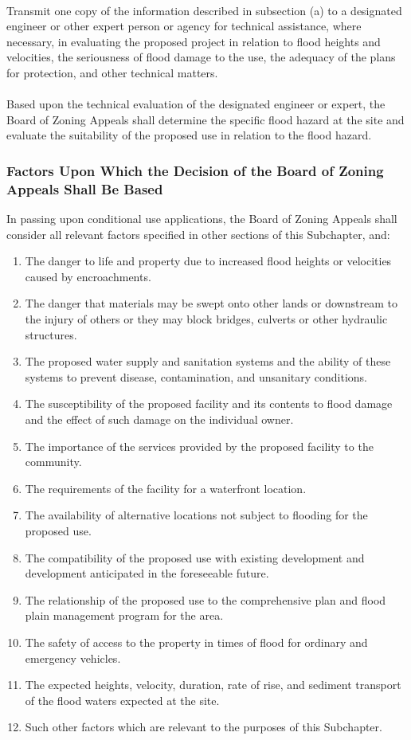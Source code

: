 \paragraph{}
Transmit one copy of the information described in subsection (a) to a designated engineer or other expert person or agency for technical assistance, where necessary, in evaluating the proposed project in relation to flood heights and velocities, the seriousness of flood damage to the use, the adequacy of the plans for protection, and other technical matters.
\paragraph{}
Based upon the technical evaluation of the designated engineer or expert, the Board of Zoning Appeals shall determine the specific flood hazard at the site and evaluate the suitability of the proposed use in relation to the flood hazard.
\subsubsection{Factors Upon Which the Decision of the Board of Zoning Appeals Shall Be Based}
In passing upon conditional use applications, the Board of Zoning Appeals shall consider all relevant factors specified in other sections of this Subchapter, and:
\begin{enumerate}[{\indent}a)]
    \item The danger to life and property due to increased flood heights or velocities caused by encroachments.
    \item The danger that materials may be swept onto other lands or downstream to the injury of others or they may block bridges, culverts or other hydraulic structures.
    \item The proposed water supply and sanitation systems and the ability of these systems to prevent disease, contamination, and unsanitary conditions.
    \item The susceptibility of the proposed facility and its contents to flood damage and the effect of such damage on the individual owner.
    \item The importance of the services provided by the proposed facility to the community.
    \item The requirements of the facility for a waterfront location.
    \item The availability of alternative locations not subject to flooding for the proposed use.
    \item The compatibility of the proposed use with existing development and development anticipated in the foreseeable future.
    \item The relationship of the proposed use to the comprehensive plan and flood plain management program for the area.
    \item The safety of access to the property in times of flood for ordinary and emergency vehicles.
    \item The expected heights, velocity, duration, rate of rise, and sediment transport of the flood waters expected at the site.
    \item Such other factors which are relevant to the purposes of this Subchapter.
\end{enumerate}
